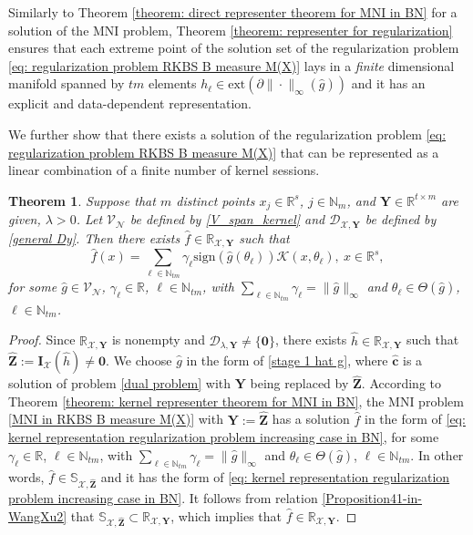 \documentclass[11pt]{article}
\newtheorem{theorem}{Theorem}
\begin{document}
Similarly to Theorem \ref{theorem: direct representer theorem for MNI in BN} for a solution of the MNI problem,
Theorem \ref{theorem: representer for regularization} ensures that 
each extreme point of the solution set of the regularization problem \eqref{eq: regularization problem RKBS B measure M(X)} lays in a {\it finite} dimensional manifold spanned by $tm$ elements  $h_\ell\in\mathrm{ext}(\partial\|\cdot\|_\infty(\hat g))$ and it has an explicit and data-dependent representation.


We further show that there exists a solution of the regularization problem \eqref{eq: regularization problem RKBS B measure M(X)} that can be represented as a linear combination of a finite number of kernel sessions.
 

\begin{theorem}
Suppose that $m$ distinct points $x_j\in\mathbb{R}^s$, $j\in\mathbb{N}_m$, and $\mathbf{Y}\in\mathbb{R}^{t\times m}$ are given, $\lambda>0$. Let $\mathcal{V}_{\mathcal{N}}$ be defined by \eqref{V_span_kernel} and $\mathcal{D}_{\mathcal{X},\mathbf{Y}}$ be defined by \eqref{general Dy}.  Then there exists $\hat f\in\mathbb{R}_{\mathcal{X},\mathbf{Y}}$ such that 
\begin{equation}\label{eq: kernel representation regularization problem increasing case in BN}
\hat f(x)=\sum\limits_{\ell\in\mathbb{N}_{tm}} \gamma_\ell\mathrm{sign}(\hat g(\theta_\ell)) \mathcal{K}(x,\theta_\ell),\ x\in\mathbb{R}^s,
\end{equation}
for some $\hat g\in\mathcal{V}_{\mathcal{N}}$,  $\gamma_\ell\in\mathbb{R}$, $\ell\in\mathbb{N}_{tm}$, with  $\sum_{\ell\in\mathbb{N}_{tm}}\gamma_\ell=\|\hat g\|_{\infty}$ and $\theta_\ell\in\Theta(\hat g)$, $\ell\in\mathbb{N}_{tm}$.
\end{theorem}

\begin{proof}
Since $\mathbb{R}_{\mathcal{X},\mathbf{Y}}$ is nonempty and $\mathcal{D}_{\lambda,\mathbf{Y}}\neq\{\mathbf{0}\}$, there exists $\hat h \in \mathbb{R}_{\mathcal{X},\mathbf{Y}}$ such that $\hat{\mathbf{Z}}:=\mathbf{I}_{\mathcal{X}}(\hat h)\neq \mathbf{0}$. We choose $\hat g$ in the form of \eqref{stage 1 hat g}, where $\hat{\mathbf{c}}$ is a solution of problem \eqref{dual problem} with $\mathbf{Y}$ being replaced by $\hat{\mathbf{Z}}$. According to Theorem \ref{theorem: kernel representer theorem for MNI in BN}, the MNI problem \eqref{MNI in RKBS B measure M(X)} with $\mathbf{Y}:=\hat{\mathbf{Z}}$ has a solution  $\hat f$ in the form of \eqref{eq: kernel representation regularization problem increasing case in BN}, for some $\gamma_\ell\in\mathbb{R}$, $\ell\in\mathbb{N}_{tm}$, with  $\sum_{\ell\in\mathbb{N}_{tm}}\gamma_\ell=\|\hat g\|_{\infty}$ and $\theta_\ell\in\Theta(\hat g)$, $\ell\in\mathbb{N}_{tm}$. In other words, $\hat f\in \mathbb{S}_{\mathcal{X},\hat{\mathbf{Z}}}$ and it has the form of \eqref{eq: kernel representation regularization problem increasing case in BN}. It follows from relation \eqref{Proposition41-in- WangXu2} that $\mathbb{S}_{\mathcal{X},\hat{\mathbf{Z}}}\subset\mathbb{R}_{\mathcal{X},\mathbf{Y}}$, which implies that $\hat f\in\mathbb{R}_{\mathcal{X},\mathbf{Y}}$.
\end{proof}
\end{document}

